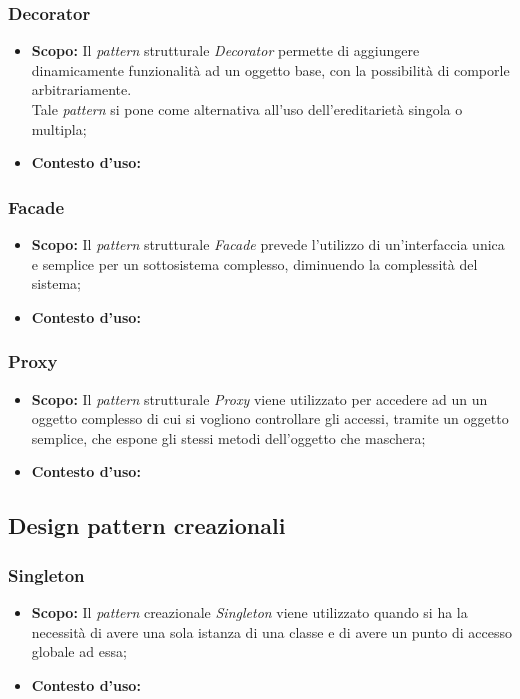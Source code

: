 \subsubsection{Decorator}
\begin{itemize}
\item \textbf{Scopo:}
Il \textit{pattern} strutturale \textit{Decorator} permette di aggiungere dinamicamente funzionalità ad un oggetto base, con la possibilità di comporle arbitrariamente.\\
Tale \textit{pattern} si pone come alternativa all'uso dell'ereditarietà singola o multipla;

\item \textbf{Contesto d'uso:}
\end{itemize}

\subsubsection{Facade}
\begin{itemize}
\item \textbf{Scopo:}
Il \textit{pattern} strutturale \textit{Facade} prevede l'utilizzo di un'interfaccia unica e semplice per un sottosistema complesso, diminuendo la complessità del sistema;

\item \textbf{Contesto d'uso:}
\end{itemize}

\subsubsection{Proxy}
\begin{itemize}
\item \textbf{Scopo:}
Il \textit{pattern} strutturale \textit{Proxy} viene utilizzato per accedere ad un un oggetto complesso di cui si vogliono controllare gli accessi, tramite un oggetto semplice, che espone gli stessi metodi dell'oggetto che maschera;

\item \textbf{Contesto d'uso:}
\end{itemize}

\subsection{Design pattern creazionali}
\subsubsection{Singleton}
\begin{itemize}
\item \textbf{Scopo:}
Il \textit{pattern} creazionale \textit{Singleton} viene utilizzato quando si ha la necessità di avere una sola istanza di una classe e di avere un punto di accesso globale ad essa;

\item \textbf{Contesto d'uso:}
\end{itemize}

